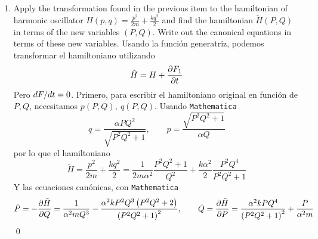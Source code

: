 \documentclass[]{article}
\numberwithin{equation}{section}
\begin{document}
\begin{enumerate}
	\item[b.] Apply the transformation found in the previous item to the hamiltonian of harmonic oscillator $H (p, q) = \frac{p^2}{2m} + \frac{kq^2}{2}$ and find the hamiltonian $\tilde{H} (P, Q)$ in terms of the new variables $(P, Q)$. Write out the canonical equations in terms of these new variables.
	\resp Usando la función generatriz, podemos transformar el hamiltoniano utilizando
	\begin{equation}
		\tilde{H} = H + \dfrac{\partial F_1}{\partial t}
	\end{equation}
	Pero $d F/d t = 0$. Primero, para escribir el hamiltoniano original en función de $P,Q$, necesitamos $p(P,Q), ~ q(P,Q)$. Usando \texttt{Mathematica}
	\begin{equation}
		q = \frac{\alpha  P Q^2}{\sqrt{P^2 Q^2+1}}, \qquad p = \frac{\sqrt{P^2 Q^2+1}}{\alpha  Q}
	\end{equation}
	por lo que el hamiltoniano
	\begin{equation}
		\tilde{H} = \frac{p^2}{2m} + \frac{kq^2}{2} = \frac{1}{2 m \alpha^2} \frac{P^2 Q^2 + 1}{ Q^2} + \frac{k\alpha^2}{2} \frac{P^2 Q^4}{P^2 Q^2 + 1}
	\end{equation}
	Y las ecuaciones canónicas, con \texttt{Mathematica}
	\begin{equation}
		\dot{P} = - \dfrac{\partial \tilde{H}}{\partial Q} = \frac{1}{\alpha ^2 m Q^3}-\frac{\alpha ^2 k P^2 Q^3 \left(P^2 Q^2+2\right)}{\left(P^2 Q^2+1\right)^2}, \qquad \dot{Q} = \dfrac{\partial \tilde{H}}{\partial P} = \frac{\alpha^2 k P Q^4}{ \left(P^2 Q^2+1\right)^2} + \frac{P}{\alpha ^2 m}
	\end{equation}
	\qed	
\end{enumerate}
\end{document}
